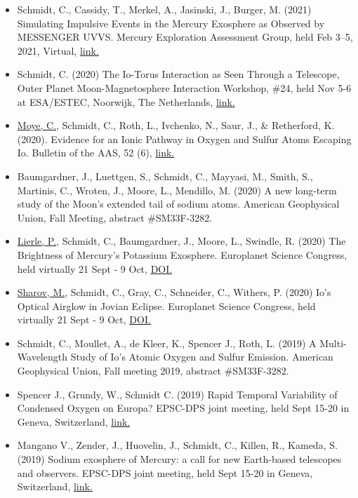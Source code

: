 \documentclass[12pt]{report}
\begin{document}
\begin{itemize}
   \item Schmidt, C., Cassidy, T., Merkel, A., Jasinski, J., Burger, M. (2021) Simulating Impulsive Events in the Mercury Exosphere as Observed by MESSENGER UVVS. Mercury Exploration Assessment Group, held Feb 3–5, 2021, Virtual, \href{https://www.hou.usra.edu/meetings/mexag2021/pdf/mexag2021_program.htm#sess201}{link.} 
   \item Schmidt, C. (2020) The Io-Torus Interaction as Seen Through a Telescope, Outer Planet Moon-Magnetosphere Interaction Workshop, \#24, held Nov 5-6 at ESA/ESTEC, Noorwijk, The Netherlands, \href{https://indico.esa.int/event/337/contributions/5611/contribution.pdf}{link.} 
   \item \underline{Moye, C.}, Schmidt, C., Roth, L., Ivchenko, N., Saur, J., \& Retherford, K. (2020). Evidence for an Ionic Pathway in Oxygen and Sulfur Atoms Escaping Io. Bulletin of the AAS, 52 (6), \href{https://baas.aas.org/pub/2020n6i318p02}{link.}
   \item Baumgardner, J., Luettgen, S., Schmidt, C., Mayyasi, M., Smith, S., Martinis, C., Wroten, J., Moore, L., Mendillo, M. (2020) A new long-term study of the Moon’s extended tail of sodium atoms. American Geophysical Union, Fall Meeting, abstract \#SM33F-3282.
   \item \underline{Lierle, P.}, Schmidt, C., Baumgardner, J., Moore, L., Swindle, R. (2020) The Brightness of Mercury's Potassium Exosphere. Europlanet Science Congress, held virtually 21 Sept - 9 Oct, \href{https://doi.org/10.5194/epsc2020-493}{DOI.}
   \item \underline{Sharov, M.}, Schmidt, C., Gray, C., Schneider, C., Withers, P. (2020) Io's Optical Airglow in Jovian Eclipse. Europlanet Science Congress, held virtually 21 Sept - 9 Oct, \href{https://doi.org/10.5194/epsc2020-457}{DOI.}
   \item Schmidt, C., Moullet, A., de Kleer, K., Spencer J., Roth, L. (2019) A Multi-Wavelength Study of Io's Atomic Oxygen and Sulfur Emission. American Geophysical Union, Fall meeting 2019, abstract \#SM33F-3282.
   \item Spencer J., Grundy, W., Schmidt C. (2019) Rapid Temporal Variability of Condensed Oxygen on Europa? EPSC-DPS joint meeting, held Sept 15-20 in Geneva, Switzerland, \href{https://meetingorganizer.copernicus.org/EPSC-DPS2019/EPSC-DPS2019-935-1.pdf}{link.}
   \item Mangano V., Zender, J., Huovelin, J., Schmidt, C., Killen, R., Kameda, S. (2019) Sodium exosphere of Mercury: a call for new Earth-based telescopes and observers. EPSC-DPS joint meeting, held Sept 15-20 in Geneva, Switzerland, \href{https://meetingorganizer.copernicus.org/EPSC-DPS2019/EPSC-DPS2019-1967-2.pdf}{link.}

\end{itemize}
\end{document}
